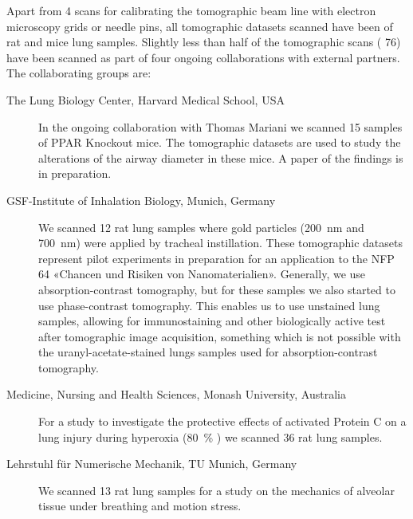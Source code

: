 \documentclass[a4paper,twoside,DIV=calc]{scrartcl}
\begin{document}
Apart from 4 scans for calibrating the tomographic beam line with electron microscopy grids or needle pins, all tomographic datasets scanned have been of rat and mice lung samples. Slightly less than half of the tomographic scans (%
76) have been scanned as part of four ongoing collaborations with external partners. The collaborating groups are:
\begin{description}
\item[The Lung Biology Center, Harvard Medical School, USA] In the ongoing collaboration with Thomas Mariani we scanned 15 samples of PPAR Knockout mice. The tomographic datasets are used to study the alterations of the airway diameter in these mice. A paper of the findings is in preparation.
\item[GSF-Institute of Inhalation Biology, Munich, Germany] We scanned 12 rat lung samples where gold particles (\SI{200}{\nano\meter} and \SI{700}{\nano\meter}) were applied by tracheal instillation. These tomographic datasets represent pilot experiments in preparation for an application to the NFP 64 «Chancen und Risiken von Nanomaterialien». Generally, we use absorption-contrast tomography, but for these samples we also started to use phase-contrast tomography. This enables us to use unstained lung samples, allowing for immunostaining and other biologically active test after tomographic image acquisition, something which is not possible with the uranyl-acetate-stained lungs samples used for absorption-contrast tomography.
\item[Medicine, Nursing and Health Sciences, Monash University, Australia] For a study to investigate the protective effects of activated Protein C on a lung injury during hyperoxia (\SI{80}{\percent} ) we scanned 36 rat lung samples. 
\item[Lehrstuhl für Numerische Mechanik, TU Munich, Germany] We scanned 13 rat lung samples for a study on the mechanics of alveolar tissue under breathing and motion stress.
\end{description}

\end{document}
